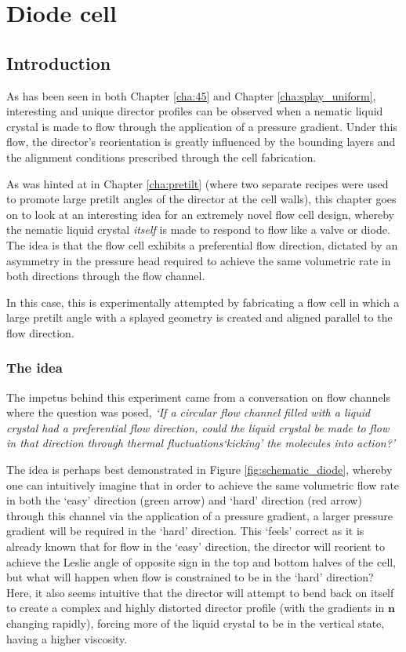 \section{Diode cell}
\label{cha:diode}
\subsection{Introduction}
As has been seen in both Chapter \ref{cha:45} and Chapter \ref{cha:splay_uniform}, interesting and unique director profiles can be observed when a nematic liquid crystal is made to flow through the application of a pressure gradient. Under this flow, the director's reorientation is greatly influenced by the bounding layers and the alignment conditions prescribed through the cell fabrication.

As was hinted at in Chapter \ref{cha:pretilt} (where two separate recipes were used to promote large pretilt angles of the director at the cell walls), this chapter goes on to look at an interesting idea for an extremely novel flow cell design, whereby the nematic liquid crystal \textit{itself} is made to respond to flow like a valve or diode. The idea is that the flow cell exhibits a preferential flow direction, dictated by an asymmetry in the pressure head required to achieve the same volumetric rate in both directions through the flow channel. 

In this case, this is experimentally attempted by fabricating a flow cell in which a large pretilt angle with a splayed geometry is created and aligned parallel to the flow direction.

\subsubsection{The idea}
The impetus behind this experiment came from a conversation on flow channels where the question was posed, \textit{`If a circular flow channel filled with a liquid crystal had a preferential flow direction, could the liquid crystal be made to flow in that direction through thermal fluctuations`kicking' the molecules into action?'}

The idea is perhaps best demonstrated in Figure \ref{fig:schematic_diode}, whereby one can intuitively imagine that in order to achieve the same volumetric flow rate in both the `easy' direction (green arrow) and `hard' direction (red arrow) through this channel via the application of a pressure gradient, a larger pressure gradient will be required in the `hard' direction. This `feels' correct as it is already known that for flow in the `easy' direction, the director will reorient to achieve the Leslie angle of opposite sign in the top and bottom halves of the cell, but what will happen when flow is constrained to be in the `hard' direction? Here, it also seems intuitive that the director will attempt to bend back on itself to create a complex and highly distorted director profile (with the gradients in $\bm{n}$ changing rapidly), forcing more of the liquid crystal to be in the vertical state, having a higher viscosity.

